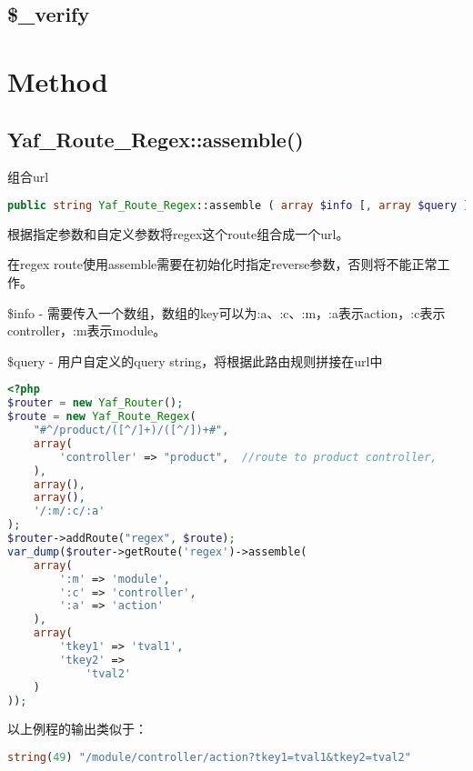 \subsection{\$\_verify}



\section{Method}


\subsection{Yaf\_Route\_Regex::assemble()}

组合url


\begin{lstlisting}[language=PHP]
public string Yaf_Route_Regex::assemble ( array $info [, array $query ] )
\end{lstlisting}

根据指定参数和自定义参数将regex这个route组合成一个url。

在regex route使用assemble需要在初始化时指定reverse参数，否则将不能正常工作。

\begin{compactitem}
\item \$info - 需要传入一个数组，数组的key可以为:a、:c、:m，:a表示action，:c表示controller，:m表示module。


\item \$query - 用户自定义的query string，将根据此路由规则拼接在url中
\end{compactitem}


\begin{lstlisting}[language=PHP]
<?php
$router = new Yaf_Router();
$route = new Yaf_Route_Regex(
    "#^/product/([^/]+)/([^/])+#",
    array(
        'controller' => "product",  //route to product controller,
    ),
    array(),
    array(),
    '/:m/:c/:a'
);
$router->addRoute("regex", $route);
var_dump($router->getRoute('regex')->assemble(
    array(
        ':m' => 'module',
        ':c' => 'controller',
        ':a' => 'action'
    ),
    array(
        'tkey1' => 'tval1',
        'tkey2' =>
            'tval2'
    )
));
\end{lstlisting}

以上例程的输出类似于：

\begin{lstlisting}[language=PHP]
string(49) "/module/controller/action?tkey1=tval1&tkey2=tval2"
\end{lstlisting}


